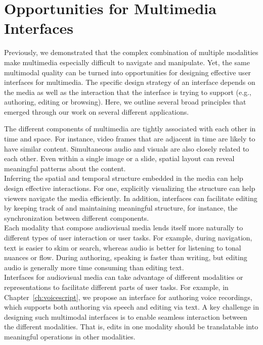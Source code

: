 \section{Opportunities for Multimedia Interfaces}
Previously, we demonstrated that the complex combination of multiple modalities make multimedia especially difficult to navigate and manipulate. Yet, the same multimodal quality can be turned into opportunities for designing effective user interfaces for multimedia. The specific design strategy of an interface depends on the media as well as the interaction that the interface is trying to support (e.g., authoring, editing or browsing). Here, we outline several broad principles that emerged through our work on several different applications.\\
%
\begin{mldescription}
 The different components of multimedia are tightly associated with each other in time and space. For instance, video frames that are adjacent in time are likely to have similar content. Simultaneous audio and visuals are also closely related to each other. Even within a single image or a slide, spatial layout can reveal meaningful patterns about the content.\\
Inferring the spatial and temporal structure embedded in the media can help design effective interactions. For one, explicitly visualizing the structure can help viewers navigate the media efficiently. In addition, interfaces can facilitate editing by keeping track of and maintaining meaningful structure, for instance, the synchronization between different components. \\
% 
 Each modality that compose audiovisual media lends itself more naturally to different types of user interaction or user tasks. For example, during navigation, text is easier to skim or search, whereas audio is better for listening to tonal nuances or flow. During authoring, speaking is faster than writing, but editing audio is generally more time consuming than editing text.\\
Interfaces for audiovisual media can take advantage of different modalities or representations to facilitate different parts of user tasks. For example, in Chapter~\ref{ch:voicescript}, we propose an interface for authoring voice recordings, which supports both authoring via speech and editing via text.  A key challenge in designing such multimodal interfaces is to enable seamless interaction between the different modalities. That is, edits in one modality should be translatable into meaningful operations in other modalities.  


\end{mldescription}
